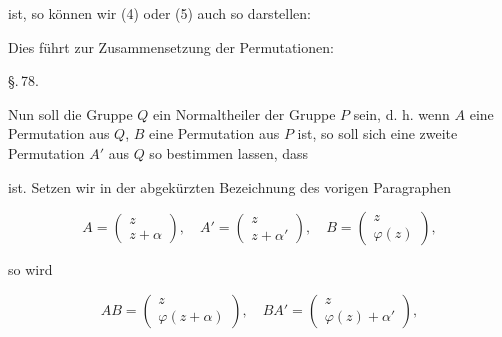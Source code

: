 ist, so können wir (4) oder (5) auch so darstellen:


Dies führt zur Zusammensetzung der Permutationen:


\begin{center}
§.\,78.

\end{center}

Nun soll die Gruppe $Q$ ein Normaltheiler der Gruppe $P$ sein, d. h. wenn $A$ eine Permutation aus $Q$, $B$ eine Permutation aus $P$ ist, so soll sich eine zweite Permutation $A'$ aus $Q$ so
bestimmen lassen, dass


ist. Setzen wir in der abgekürzten Bezeichnung des vorigen Paragraphen

\[
A = \begin{pmatrix} z \\ z+\alpha \end{pmatrix}, \quad A' = \begin{pmatrix} z \\ z+\alpha' \end{pmatrix}, \quad B = \begin{pmatrix} z \\ \varphi(z) \end{pmatrix},
\]

so wird

\[
AB = \begin{pmatrix} z \\ \varphi(z+\alpha) \end{pmatrix}, \quad BA' = \begin{pmatrix} z \\ \varphi(z)+\alpha' \end{pmatrix},
\]

